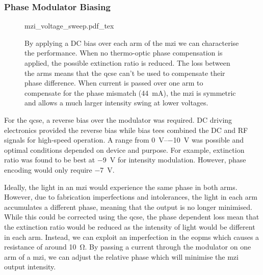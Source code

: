 \subsubsection*{Phase Modulator Biasing}

\begin{figure}[t]
	\centering
	\def\svgwidth{\textwidth} 
	{mzi_voltage_sweep.pdf_tex}
	\caption[MZI calibration through thermo-optic modulation]{By applying a DC bias over each arm of the \ac{mzi} we can characterise the performance. When no thermo-optic phase compensation is applied, the possible extinction ratio is reduced. The loss between the arms means that the \ac{qcse} can't be used to compensate their phase difference. When current is passed over one arm to compensate for the phase mismatch (\SI{44}{\mA}), the \ac{mzi} is symmetric and allows a much larger intensity swing at lower voltages.}
	\label{fig:mzi_cal}
\end{figure}

For the \ac{qcse}, a reverse bias over the modulator was required. DC driving electronics provided the reverse bias while bias tees combined the DC and RF signals for high-speed operation. A range from \SIrange{0}{-10}{\V} was possible and optimal conditions depended on device and purpose. For example, extinction ratio was found to be best at \SI{-9}{\V} for intensity modulation. However, phase encoding would only require \SI{-7}{\V}.





Ideally, the light in an \ac{mzi} would experience the same phase in both arms. However, due to fabrication imperfections and intolerances, the light in each arm accumulates a different phase, meaning that the output is no longer minimised. While this could be corrected using the \ac{qcse}, the phase dependent loss mean that the extinction ratio would be reduced as the intensity of light would be different in each arm. Instead, we can exploit an imperfection in the \acp{eopm} which causes a resistance of around \SI{10}{\ohm}. By passing a current through the modulator on one arm of a \ac{mzi}, we can adjust the relative phase which will minimise the \ac{mzi} output intensity.

